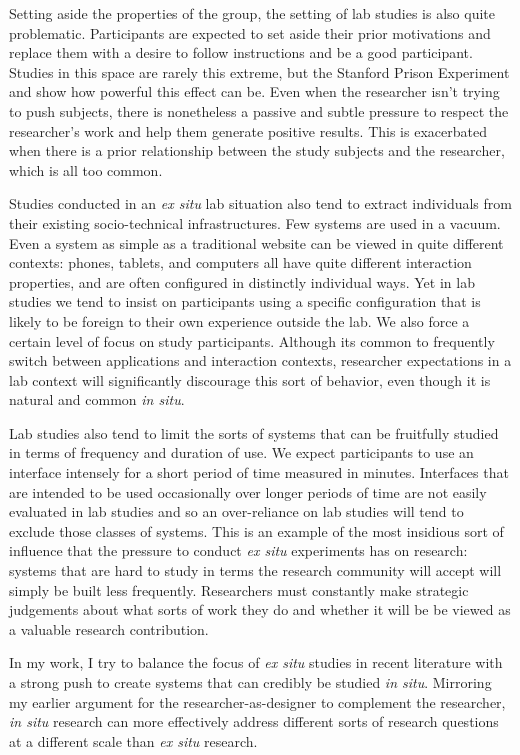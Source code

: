 Setting aside the properties of the group, the setting of lab studies is also quite problematic. Participants are expected to set aside their prior motivations and replace them with a desire to follow instructions and be a good participant. Studies in this space are rarely this extreme, but the Stanford Prison Experiment \cite{stanford_prison_exp} and \cite{authority_experiment_with_shocks} show how powerful this effect can be. Even when the researcher isn't trying to push subjects, there is nonetheless a passive and subtle pressure to respect the researcher's work and help them generate positive results. This is exacerbated when there is a prior relationship between the study subjects and the researcher, which is all too common. 

Studies conducted in an \emph{ex situ} lab situation also tend to extract individuals from their existing socio-technical infrastructures. Few systems are used in a vacuum. Even a system as simple as a traditional website can be viewed in quite different contexts: phones, tablets, and computers all have quite different interaction properties, and are often configured in distinctly individual ways. Yet in lab studies we tend to insist on participants using a specific configuration that is likely to be foreign to their own experience outside the lab. We also force a certain level of focus on study participants. Although its common to frequently switch between applications and interaction contexts, researcher expectations in a lab context will significantly discourage this sort of behavior, even though it is natural and common \emph{in situ}. 

Lab studies also tend to limit the sorts of systems that can be fruitfully studied in terms of frequency and duration of use. We expect participants to use an interface intensely for a short period of time measured in minutes. Interfaces that are intended to be used occasionally over longer periods of time are not easily evaluated in lab studies and so an over-reliance on lab studies will tend to exclude those classes of systems. This is an example of the most insidious sort of influence that the pressure to conduct \emph{ex situ} experiments has on research: systems that are hard to study in terms the research community will accept will simply be built less frequently. Researchers must constantly make strategic judgements about what sorts of work they do and whether it will be be viewed as a valuable research contribution. 

In my work, I try to balance the focus of \emph{ex situ} studies in recent literature with a strong push to create systems that can credibly be studied \emph{in situ}. Mirroring my earlier argument for the researcher-as-designer to complement the researcher, \emph{in situ} research can more effectively address different sorts of research questions at a different scale than \emph{ex situ} research.

